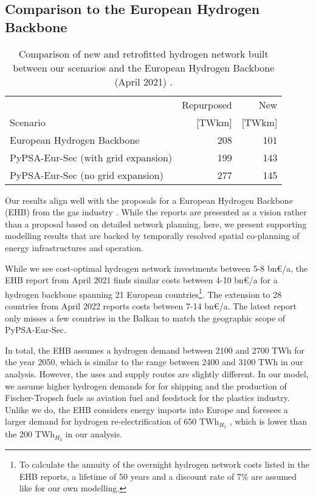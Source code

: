 \subsection*{Comparison to the European Hydrogen Backbone}

\begin{table}
  \caption{Comparison of new and retrofitted hydrogen network built between our scenarios and the European Hydrogen Backbone (April 2021) \cite{gasforclimateExtendingEuropean2021}.}
  \label{tab:ehb}
  \centering
  \begin{tabular}{lrr}
      \toprule
       & Repurposed & New \\
       Scenario& [TWkm] & [TWkm] \\
      \midrule
      European Hydrogen Backbone \cite{gasforclimateExtendingEuropean2021} & 208 & 101 \\
      PyPSA-Eur-Sec (with grid expansion) & 199 & 143  \\
      PyPSA-Eur-Sec (no grid expansion) & 277 & 145 \\
      \bottomrule
    \end{tabular}
\end{table}


Our results align well with the proposals for a European Hydrogen Backbone (EHB)
from the gas industry
\cite{gasforclimateEuropeanHydrogen2020,gasforclimateExtendingEuropean2021,gasforclimateEuropeanHydrogen2021,gasforclimateEuropeanHydrogen2022}.
While the reports are presented as a vision rather than a proposal based on
detailed network planning, here, we present supporting modelling results that
are backed by temporally resolved spatial co-planning of energy infrastructures
and operation.

While we see cost-optimal hydrogen network investments between 5-8 bn\euro/a,
the EHB report from April 2021 \cite{gasforclimateExtendingEuropean2021} finds
similar costs between 4-10 bn\euro/a for a hydrogen backbone spanning 21
European countries\footnote{To calculate the annuity of the overnight hydrogen
network costs listed in the EHB reports, a lifetime of 50 years and a discount
rate of 7\% are assumed like for our own modelling.}. The extension to 28
countries from April 2022 \cite{gasforclimateEuropeanHydrogen2022} reports costs
between 7-14 bn\euro/a. The latest report only misses a few countries in the
Balkan to match the geographic scope of PyPSA-Eur-Sec.

In total, the EHB \cite{gasforclimateEuropeanHydrogen2021} assumes a hydrogen
demand between 2100 and 2700 TWh for the year 2050, which is similar to the
range between 2400 and 3100 TWh in our analysis. However, the uses and supply
routes are slightly different. In our model, we assume higher hydrogen demands
for for shipping and the production of Fischer-Tropsch fuels as aviation fuel
and feedstock for the plastics industry. Unlike we do, the EHB considers energy
imports into Europe and foresees a larger demand for hydrogen re-electrification
of 650 TWh$_{H_2}$ \cite{gasforclimateEuropeanHydrogen2021}, which is lower than
the 200 TWh$_{H_2}$ in our analysis.

